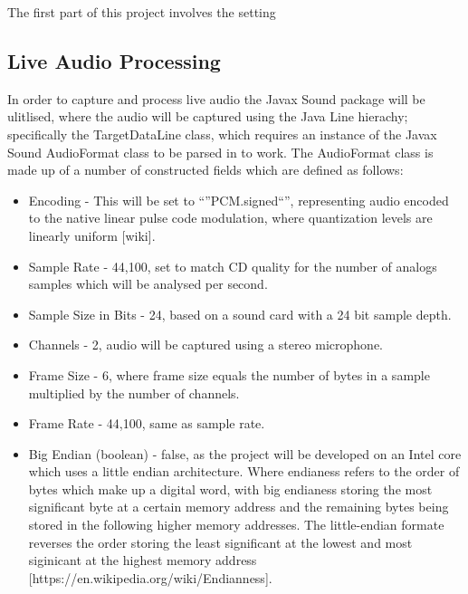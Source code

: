 \documentclass[a4paper, 11pt]{article}
\begin{document}
The first part of this project involves the setting 

\subsection{Live Audio Processing}
In order to capture and process live audio the Javax Sound package will be ulitlised, where the audio will be captured using the Java Line hierachy; specifically the TargetDataLine class, which requires an instance of the Javax Sound AudioFormat class to be parsed in to work. The AudioFormat class is made up of a number of constructed fields which are defined as follows:

\begin{itemize}
\item Encoding - This will be set to ``''PCM.signed``'', representing audio encoded to the native linear pulse code modulation, where quantization levels are linearly uniform [wiki].
\item Sample Rate - 44,100, set to match CD quality for the number of analogs samples which will be analysed per second. 
\item Sample Size in Bits - 24, based on a sound card with a 24 bit sample depth.
\item Channels - 2, audio will be captured using a stereo microphone.
\item Frame Size - 6, where frame size equals the number of bytes in a sample multiplied by the number of channels.
\item Frame Rate - 44,100, same as sample rate.
\item Big Endian (boolean) - false, as the project will be developed on an Intel core which uses a little endian architecture. Where endianess refers to the order of bytes which make up a digital word, with big endianess storing the most significant byte at a certain memory address and the remaining bytes being stored in the following higher memory addresses. The little-endian formate reverses the order storing the least significant at the lowest and most siginicant at the highest memory address [https://en.wikipedia.org/wiki/Endianness].
\end{itemize}
\end{document}
